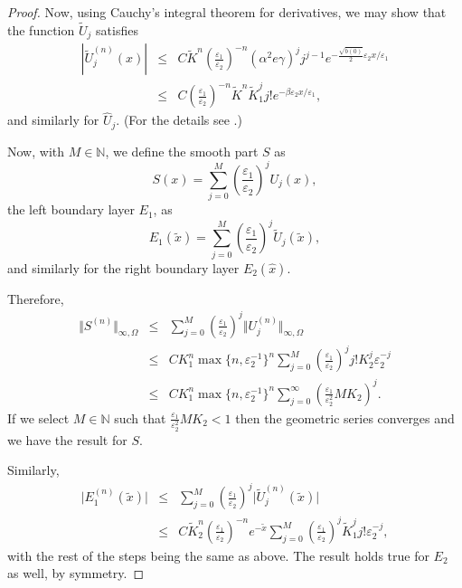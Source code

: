 \documentclass[12pt]{article}
\newcommand{\eps}{\varepsilon}
\begin{document}
\begin{proof}
Now, using Cauchy's integral theorem for derivatives, we may show that the function $\tilde{U}_j$ satisfies
%
\begin{eqnarray*}
\left|\tilde{U}_j^{(n)}({x})\right| &\leq& C \tilde{K}^n \left( \frac{\eps_1}{\eps_2} \right)^{-n} \left(\alpha^2 e \gamma\right)^j j^{j-1} e^{-\frac{\sqrt{b(0)}}{2} \eps_2 {x} / \eps_1} \\
&\leq& C \left( \frac{\eps_1}{\eps_2} \right)^{-n} \tilde{K}^n \tilde{K}_1^{j} j!  e^{-\beta \eps_2 {x} / \eps_1},
\end{eqnarray*}
and similarly for $ \hat{U}_j$. (For the details see \cite[Corollary 1]{PCarXiv}.)

Now, with $M \in \mathbb{N}$, we define the smooth part $S$ as
%
$$
S(x) = \sum_{j=0}^M \left( \frac{\eps_1}{\eps_2} \right)^j U_j(x),
$$
the left boundary layer $E_1$, as
$$
E_1(\tilde{x}) = \sum_{j=0}^M \left( \frac{\eps_1}{\eps_2} \right)^j \tilde{U}_j(\tilde{x}),
$$
and similarly for the right boundary layer $E_2(\hat{x})$. 

Therefore,
\begin{eqnarray*}
\Vert S^{(n)} \Vert_{\infty,\Omega} &\leq& \sum_{j=0}^M \left( \frac{\eps_1}{\eps_2} \right)^j \Vert U_j^{(n)} \Vert_{\infty,\Omega} \\
&\leq& C K_1^n  \max\{ n, \eps_2^{-1} \}^{n} \sum_{j=0}^M \left( \frac{\eps_1}{\eps_2} \right)^j j! K_{2}^{j} \eps_2^{-j}  \\
&\leq& C K_1^n  \max\{ n, \eps_2^{-1} \}^{n} \sum_{j=0}^{\infty} \left( \frac{\eps_1}{\eps^2_2} M K_{2}  \right)^j .
\end{eqnarray*}
If we select $M \in \mathbb{N}$ such that $\frac{\eps_1}{\eps^2_2} M K_{2} < 1$ then the geometric series converges and we have the result for $S$.

Similarly,
%
\begin{eqnarray*}
\vert E^{(n)}_1(\tilde{x}) \vert &\leq& \sum_{j=0}^M \left( \frac{\eps_1}{\eps_2} \right)^j \vert \tilde{U}^{(n)}_j(\tilde{x}) \vert \\
&\leq&C  \tilde{K}_{2}^{n} \left( \frac{\eps_1}{\eps_2} \right)^{-n} e^{-\tilde{x}} \sum_{j=0}^M \left( \frac{\eps_1}{\eps_2} \right)^j   \tilde{K}^j_1 j!\eps_2^{-j} ,
\end{eqnarray*}
with the rest of the steps being the same as above. The result holds true for $E_2$ as well, by symmetry.


\end{proof}
\end{document}
